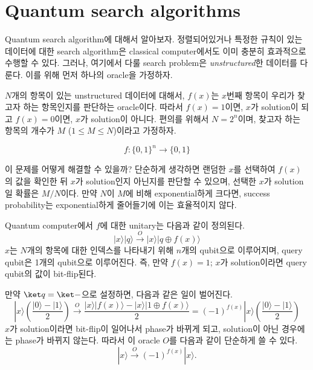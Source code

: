 \section{Quantum search algorithms}
Quantum search algorithm에 대해서 알아보자. 정렬되어있거나 특정한 규칙이 있는 데이터에 대한 search algorithm은 classical computer에서도 이미 충분히 효과적으로 수행할 수 있다. 그러나, 여기에서 다룰 search problem은 \textit{unstructured}한 데이터를 다룬다.
이를 위해 먼저 하나의 oracle을 가정하자. 

$N$개의 항목이 있는 unstructured 데이터에 대해서, $f(x)$는 $x$번째 항목이 우리가 찾고자 하는 항목인지를 판단하는 oracle이다. 따라서 $f(x) = 1$이면, $x$가 solution이 되고 $f(x) =0$이면, $x$가 solution이 아니다.
편의를 위해서 $N=2^n$이며, 찾고자 하는 항목의 개수가 $M$ ($1 \le M \le N$)이라고 가정하자. 

\begin{equation*}
  f : \{0, 1\}^n \rightarrow \{0, 1\}
\end{equation*}

이 문제를 어떻게 해결할 수 있을까? 단순하게 생각하면 랜덤한 $x$를 선택하여 $f(x)$의 값을 확인한 뒤 $x$가 solution인지 아닌지를 판단할 수 있으며, 선택한 $x$가 solution일 확률은 $M/N$이다. 만약 $N$이 $M$에 비해 exponential하게 크다면, success probability는 exponential하게 줄어들기에 이는 효율적이지 않다. 

Quantum computer에서 $f$에 대한 unitary는 다음과 같이 정의된다.
\begin{equation*}
  |x\rangle|q\rangle \xrightarrow{O}|x\rangle|q \oplus f(x)\rangle
\end{equation*}
$x$는 $N$개의 항목에 대한 인덱스를 나타내기 위해 $n$개의 qubit으로 이루어지며, query qubit은 1개의 qubit으로 이루어진다. 즉, 만약 $f(x) = 1$; $x$가 solution이라면 query qubit의 값이 bit-flip된다.

만약 $\ket q = \ket -$으로 설정하면, 다음과 같은 일이 벌어진다.
\begin{equation*}
  |x\rangle\left(\frac{|0\rangle-|1\rangle}{2}\right) \xrightarrow{O} \frac{|x\rangle|f(x)\rangle-|x\rangle|1 \oplus f(x)\rangle}{2}=(-1)^{f(x)}|x\rangle\left(\frac{|0\rangle-|1\rangle}{2}\right)
\end{equation*}
$x$가 solution이라면 bit-flip이 일어나서 phase가 바뀌게 되고, solution이 아닌 경우에는 phase가 바뀌지 않는다. 따라서 이 oracle $O$를 다음과 같이 단순하게 쓸 수 있다.
\begin{equation*}
  |x\rangle \xrightarrow{O}(-1)^{f(x)}|x\rangle .
\end{equation*}

